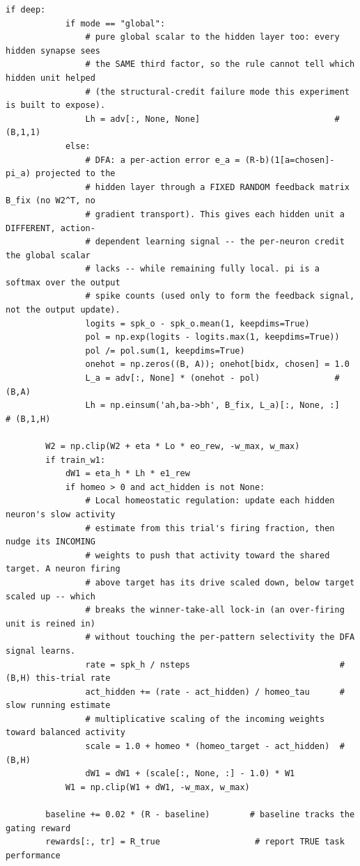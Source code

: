 \begin{lstlisting}[caption={mrl\_trace/deep.py},label={lst:siox-src-deep}]
        if deep:
            if mode == "global":
                # pure global scalar to the hidden layer too: every hidden synapse sees
                # the SAME third factor, so the rule cannot tell which hidden unit helped
                # (the structural-credit failure mode this experiment is built to expose).
                Lh = adv[:, None, None]                           # (B,1,1)
            else:
                # DFA: a per-action error e_a = (R-b)(1[a=chosen]-pi_a) projected to the
                # hidden layer through a FIXED RANDOM feedback matrix B_fix (no W2^T, no
                # gradient transport). This gives each hidden unit a DIFFERENT, action-
                # dependent learning signal -- the per-neuron credit the global scalar
                # lacks -- while remaining fully local. pi is a softmax over the output
                # spike counts (used only to form the feedback signal, not the output update).
                logits = spk_o - spk_o.mean(1, keepdims=True)
                pol = np.exp(logits - logits.max(1, keepdims=True))
                pol /= pol.sum(1, keepdims=True)
                onehot = np.zeros((B, A)); onehot[bidx, chosen] = 1.0
                L_a = adv[:, None] * (onehot - pol)               # (B,A)
                Lh = np.einsum('ah,ba->bh', B_fix, L_a)[:, None, :]   # (B,1,H)

        W2 = np.clip(W2 + eta * Lo * eo_rew, -w_max, w_max)
        if train_w1:
            dW1 = eta_h * Lh * e1_rew
            if homeo > 0 and act_hidden is not None:
                # Local homeostatic regulation: update each hidden neuron's slow activity
                # estimate from this trial's firing fraction, then nudge its INCOMING
                # weights to push that activity toward the shared target. A neuron firing
                # above target has its drive scaled down, below target scaled up -- which
                # breaks the winner-take-all lock-in (an over-firing unit is reined in)
                # without touching the per-pattern selectivity the DFA signal learns.
                rate = spk_h / nsteps                              # (B,H) this-trial rate
                act_hidden += (rate - act_hidden) / homeo_tau      # slow running estimate
                # multiplicative scaling of the incoming weights toward balanced activity
                scale = 1.0 + homeo * (homeo_target - act_hidden)  # (B,H)
                dW1 = dW1 + (scale[:, None, :] - 1.0) * W1
            W1 = np.clip(W1 + dW1, -w_max, w_max)

        baseline += 0.02 * (R - baseline)        # baseline tracks the gating reward
        rewards[:, tr] = R_true                   # report TRUE task performance


\end{lstlisting}
